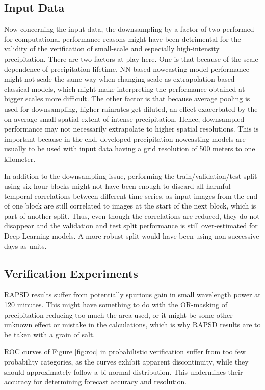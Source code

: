 \subsection*{Input Data}

Now concerning the input data, the downsampling by a factor of two performed for computational performance reasons might have been detrimental for the validity of the verification of small-scale and especially high-intensity precipitation. There are two factors at play here. One is that because of the scale-dependence of precipitation lifetime, NN-based nowcasting model performance might not scale the same way when changing scale as extrapolation-based classical models, which might make interpreting the performance obtained at bigger scales more difficult. The other factor is that because average pooling is used for downsampling, higher rainrates get diluted, an effect exacerbated by the on average small spatial extent of intense precipitation. Hence, downsampled performance may not necessarily extrapolate to higher spatial resolutions. This is important because in the end, developed precipitation nowcasting models are usually to be used with input data having a grid resolution of 500 meters to one kilometer. 

In addition to the downsampling issue, performing the train/validation/test split using six hour blocks might not have been enough to discard all harmful temporal correlations between different time-series, as input images from the end of one block are still correlated to images at the start of the next block, which is part of another split. Thus, even though the correlations are reduced, they do not disappear and the validation and test split performance is still over-estimated for Deep Learning models. A more robust split would have been using non-successive days as units.

\subsection*{Verification Experiments}

RAPSD results suffer from potentially spurious gain in small wavelength power at 120 minutes. This might have something to do with the OR-masking of precipitation reducing too much the area used, or it might be some other unknown effect or mistake in the calculations, which is why RAPSD results are to be taken with a grain of salt. 

ROC curves of Figure \ref{fig:roc} in probabilistic verification suffer from too few probability categories, as the curves exhibit apparent discontinuity, while they should approximately follow a bi-normal distribution. This undermines their accuracy for determining forecast accuracy and resolution.

